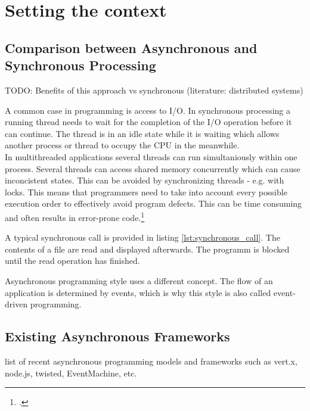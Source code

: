 \section{Setting the context}
\label{setting_the_context}

\subsection{Comparison between Asynchronous and Synchronous Processing}
\label{comparison}
TODO: Benefits of this approach vs synchronous (literature: distributed systems)

A common case in programming is access to I/O.
In synchronous processing a running thread needs to wait for the completion of
the I/O operation before it can continue.
The thread is in an idle state while it is waiting which allows another process 
or thread to occupy the CPU in the meanwhile.\\

In multithreaded applications several threads can run simultaniously within one
process. Several threads can access shared memory concurrently which can
cause inconcistent states. This can be avoided by synchronizing threads - e.g.
with locks. This means that programmers need to take into account every possible
execution order to effectively avoid program defects. This can be time consuming
and often results in error-prone code.\footcite[Cf.][TODO]{Breshears_2009}

A typical synchronous call is provided in listing \ref{lst:synchronous_call}. The
contents of a file are read and displayed afterwards. The programm is blocked until the
read operation has finished.




Asynchronous programming style uses a different concept. The flow of an
application is determined by events, which is why this style is also called
event-driven programming.




\subsection{Existing Asynchronous Frameworks}
\label{existing_frameworks}
list of recent asynchronous programming models and frameworks such as vert.x,
node.js, twisted, EventMachine, etc.

